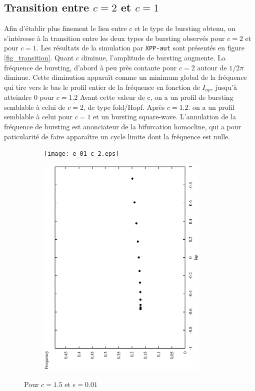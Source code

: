 \documentclass[12pt,a4paper,onecolumn]{article}
\begin{document}
\subsection{Transition entre $c=2$ et $c=1$}

Afin d'établir plus finement le lien entre $c$ et le type de bursting obtenu, on s'intéresse à la transition entre les deux types de bursting observés pour $c=2$ et pour $c=1$. Les résultats de la simulation par \texttt{XPP-aut} sont présentés en figure \ref{fig_transition}. Quant $c$ diminue, l'amplitude de bursting augmente. La fréquence de bursting, d'abord à peu près contante pour $c=2$ autour de $1/2\pi$ diminue. Cette diminution apparaît comme un minimum global de la fréquence qui tire vers le bas le profil entier de la fréquence en fonction de $I_{ap}$, jusqu'à atteindre 0 pour $c=1.2$ Avant cette valeur de c, on a un profil de bursting semblable à celui de $c=2$, de type fold/Hopf. Après $c=1.2.$ on a un profil semblable à celui pour $c=1$ et un bursting square-wave. L'annulation de la fréquence de bursting est anonciateur de la bifurcation homocline, qui a pour paticularité de faire apparaître un cycle limite dont la fréquence est nulle.


\begin{figure}[htb]
	\centering
	\begin{subfigure}[b]{\textwidth}
		\texttt{[image: e\_01\_c\_2.eps]}
	\end{subfigure}
%
	\begin{subfigure}[b]{\textwidth}
		\includegraphics[angle = 270, width = 0.9\textwidth]{freq_c_2.eps}
	\end{subfigure}
	\caption{Pour $c = 1.5$ et $\epsilon = 0.01$}
\end{figure}
\end{document}
